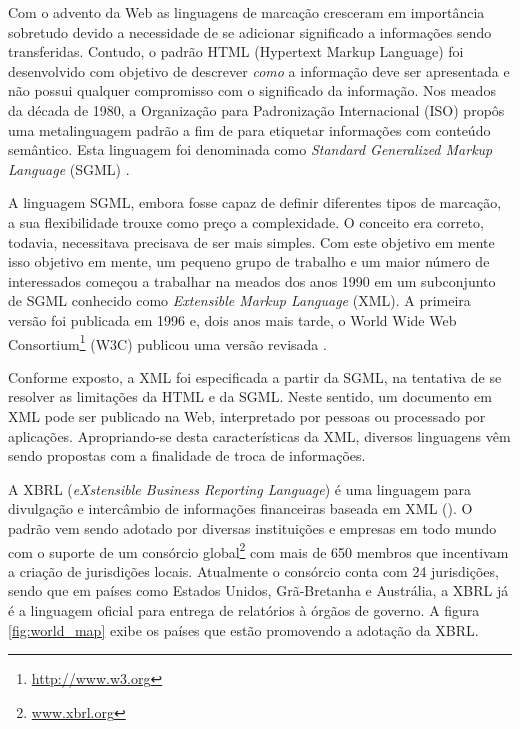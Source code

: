 \documentclass[msc,proposal]{ppgccufmg} %
\begin{document}
Com o advento da Web as linguagens de marcação cresceram em importância sobretudo devido a necessidade de se adicionar significado a informações sendo transferidas. Contudo, o padrão HTML (Hypertext
Markup Language) foi desenvolvido com objetivo de descrever \textit{como} a informação deve ser apresentada e não possui qualquer compromisso com o significado da informação. Nos meados da década de 1980,  a Organização para Padronização Internacional (ISO) propôs uma metalinguagem padrão a fim de para etiquetar informações com conteúdo semântico. Esta linguagem foi denominada como \textit{Standard Generalized Markup Language} (SGML) \cite{smith1988sgml}.

A linguagem SGML, embora fosse capaz de definir diferentes tipos de marcação, a sua flexibilidade trouxe como preço a complexidade. O conceito era correto, todavia, necessitava precisava de ser mais simples. Com este objetivo em mente isso objetivo em mente, um pequeno grupo de trabalho e um maior número de interessados começou a trabalhar na
meados dos anos 1990 em um subconjunto de SGML conhecido como \textit{Extensible Markup Language} (XML). A primeira versão foi publicada em 1996 e, dois anos mais tarde, o World Wide Web Consortium\footnote{\url{http://www.w3.org}} (W3C) publicou uma versão revisada \cite{Fawcett:2012:BX:2408362}{}.

Conforme exposto, a XML foi especificada a partir da SGML, na tentativa de se resolver as limitações da HTML
e da SGML. Neste sentido, um documento em XML pode ser publicado na Web, interpretado por pessoas
ou processado por aplicações. Apropriando-se desta características da XML, diversos linguagens vêm sendo propostas com a finalidade de troca de informações.

A XBRL (\textit{eXstensible Business Reporting Language}) é uma linguagem para divulgação e intercâmbio de informações financeiras baseada em XML (\cite{xbrl_conceitos_aplicacoes}). O padrão vem sendo adotado por diversas instituições e empresas em todo mundo com o suporte de um consórcio global\footnote{\url{www.xbrl.org}} com mais de 650 membros que incentivam a criação de jurisdições locais. Atualmente o consórcio conta com 24 jurisdições, sendo que em países como  Estados Unidos, Grã-Bretanha e Austrália, a XBRL já é a linguagem oficial para entrega de relatórios à órgãos de governo. A figura \ref{fig:world_map} exibe os países que estão promovendo a adotação da XBRL.
\end{document}
